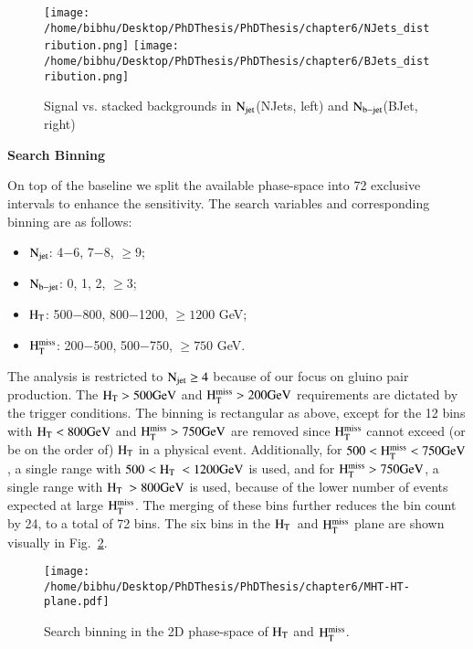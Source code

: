 \begin{itemize}
\begin{figure}[h]
\begin{center}
\texttt{[image: /home/bibhu/Desktop/PhDThesis/PhDThesis/chapter6/NJets\_distribution.png]}
\texttt{[image: /home/bibhu/Desktop/PhDThesis/PhDThesis/chapter6/BJets\_distribution.png]}
\caption{\label{fig:SigvsBkgSearchVariables2Thesis} Signal vs. stacked backgrounds in $\rm N_{jet}$(NJets, left) and $\rm N_{b-jet}$(BJet, right)}
\end{center}
\end{figure}


\end{itemize}

  {\bf Search Binning}


On top of the baseline we split the available phase-space into 72 exclusive intervals to enhance the sensitivity. The search variables and corresponding binning are as follows:
\begin{itemize}
\item $\rm N_{jet}$: 4$-$6, 7$-$8, $\geq 9$;
\item $\rm N_{b-jet}$: 0, 1, 2, $\geq 3$;
\item $\rm H_{T}$: 500$-$800, 800$-$1200, $\geq 1200$ GeV;
\item $\rm H_{T}^{miss}$: 200$-$500, 500$-$750, $\geq 750$ GeV.
\end{itemize}
The analysis is restricted to $\rm N_{jet}\geq 4$ because of our focus
on gluino pair production. The $\rm H_{T}>500 GeV$ and $\rm H_{T}^{miss}>200 GeV$ requirements
are dictated by the trigger conditions. The binning is rectangular as above, except for the 12 bins with $\rm H_{T} < 800 GeV$ 
and $\rm H_{T}^{miss} > 750 GeV$ are removed since $\rm H_{T}^{miss}$ cannot exceed (or be on the order of) $\rm H_{T}$
in a physical event. Additionally, for $\rm 500 <  H_{T}^{miss} < 750 GeV$, a single range with $\rm 500 <  H_{T}\ < 1200 GeV$ is used, and
for $\rm H_{T}^{miss} > 750 GeV$, a single range with $\rm H_{T}\ > 800 GeV$ is used,
because of the lower number of events expected at large $\rm H_{T}^{miss}$. The merging of these bins further
reduces the bin count by 24, to a total of 72 bins. The six bins in the $\rm H_{T}$\ and $\rm H_{T}^{miss}$ plane are
shown visually in Fig.~\ref{fig:HT-MHT}.


\begin{figure}[h]
\begin{center}
\texttt{[image: /home/bibhu/Desktop/PhDThesis/PhDThesis/chapter6/MHT-HT-plane.pdf]}

\caption{\label{fig:HT-MHT} Search binning in the 2D phase-space of $\rm H_{T}$ and $\rm H_{T}^{miss}$.}
\end{center}
\end{figure}






